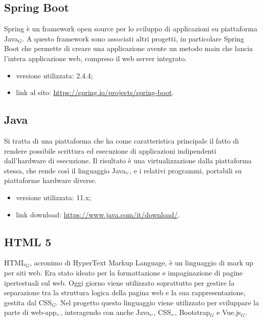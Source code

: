 \subsection{Spring Boot} \label{TecnologieSpring}
Spring è un framework open source per lo sviluppo di applicazioni su piattaforma Java$_G$. A  questo framework sono associati altri progetti, in particolare Spring Boot che permette di creare una applicazione avente un metodo main che lancia l'intera applicazione web, compreso il web server integrato.
\begin{itemize}
	\item versione utilizzata: 2.4.4;
	\item link al sito: \url{https://spring.io/projects/spring-boot}.
\end{itemize}

\subsection{Java}\label{TecnologieJava}
Si tratta di una piattaforma che ha come caratteristica principale il fatto di rendere possibile scrittura ed esecuzione di applicazioni indipendenti dall'hardware di esecuzione.
Il risultato è una virtualizzazione dalla piattaforma stessa, che rende così il linguaggio Java$_{\scaleto{G}{3pt}}$, e i relativi programmi, portabili su piattaforme hardware diverse.

\begin{itemize}
	\item versione utilizzata: 11.x;
	\item link download: \url{https://www.java.com/it/download/}.
\end{itemize}

\subsection{HTML 5}\label{TecnologieHTML}
HTML$_G$, acronimo di HyperText Markup Language, è un linguaggio di mark up per siti web.
Era stato ideato per la formattazione e impaginazione di pagine ipertestuali sul web.
Oggi giorno viene utilizzato soprattutto per gestire la separazione tra la struttura logica della pagina web e la sua rappresentazione, gestita dal CSS$_G$.
Nel progetto questo linguaggio viene utilizzato per sviluppare la parte di web-app$_{\scaleto{G}{3pt}}$, interagendo con anche Java$_{\scaleto{G}{3pt}}$, CSS$_{\scaleto{G}{3pt}}$, Bootstrap$_G$ e Vue.js$_G$.


